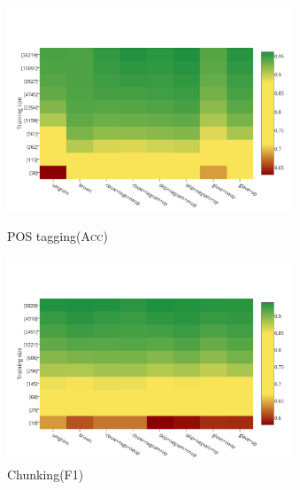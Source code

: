\documentclass{beamer}
\newcommand{\task}[1]{\textsf{#1}\xspace}
\newcommand{\pos}{\task{POS tagging}}
\newcommand{\chunking}{\task{Chunking}}
\newcommand{\evmeasure}[1]{\textsc{#1}\xspace}
\newcommand{\accuracy}{\evmeasure{Acc}}
\newcommand{\fscore}{\evmeasure{F1}}
\begin{document}
\begin{frame}[plain]

\begin{columns}
  \begin{figure}
    \includegraphics[scale=0.22]{../plots/map-pos-color-invert}    	   
    \caption{\pos (\accuracy)}	
	\vspace{-0.3cm}
    \includegraphics[scale=0.22]{../plots/map-chunk-color-invert}
   	\caption{\chunking (\fscore)}		
  \end{figure}  
    \begin{figure}

\end{figure}
\end{columns}
\end{frame}
\end{document}
